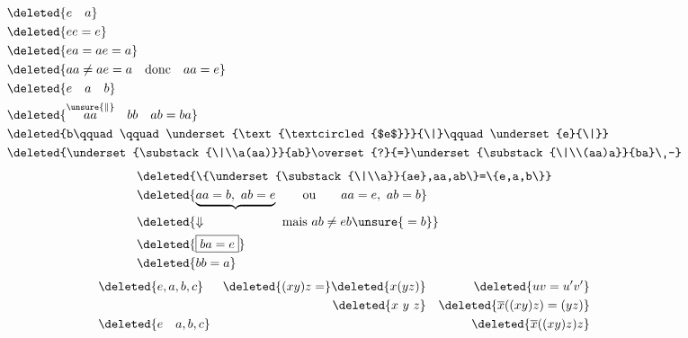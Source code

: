 \[
\begin{aligned}
&\deleted{e\quad a}\\
&\deleted{ee=e}\\
&\deleted{ea=ae=a}\\
&\deleted{aa\ne ae=a\quad\text{donc}\quad aa=e}\\
&\deleted{e\quad a\quad b}\\
&\deleted{\overset{\unsure{\|}}{aa}\quad bb\quad ab=ba}\\
&\deleted{b\qquad\qquad\underset{\text{\textcircled{$e$}}}{\|}\qquad\underset{e}{\|}}\\
&\deleted{\underset{\substack{\|\\a(aa)}}{ab}\overset{?}{=}\underset{\substack{\|\\(aa)a}}{ba}\ -}
\end{aligned}
\]
\[
\begin{aligned}
&\deleted{\{\underset{\substack{\|\\a}}{ae},aa,ab\}=\{e,a,b\}}\\
&\deleted{\underbrace{aa=b,\ ab=e}\qquad\text{ou}\qquad aa=e,\ ab=b}\\
&\deleted{\Downarrow\qquad\qquad\qquad\text{mais }ab\ne eb\unsure{{}=b}}\\
&\deleted{\boxed{ba=e}}\\
&\deleted{bb=a}
\end{aligned}
\]
\[
\begin{aligned}
&\deleted{e,a,b,c}&\deleted{(xy)z=}\deleted{x(yz)}&&\deleted{uv=u'v'}\\
&&\deleted{x\ y\ z}&&\deleted{\overline x((xy)z)=(yz)}\\
&\deleted{e\quad a,b,c}&&&\deleted{\overline x((xy)z)z}
\end{aligned}
\]

